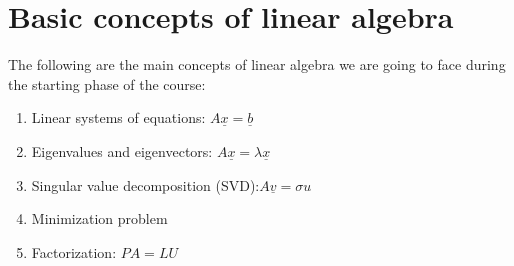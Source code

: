 \section{Basic concepts of linear algebra}
The following are the main concepts of linear algebra we are going to face during the starting phase of the course:
\begin{enumerate}
    \item Linear systems of equations: $A\underline{x} = \underline{b}$
    \item Eigenvalues and eigenvectors: $A\underline{x} = \lambda \underline{x}$
    \item Singular value decomposition (SVD):$A\underline{v} = \sigma u$
    \item Minimization problem
    \item Factorization: $PA = LU$
\end{enumerate}



